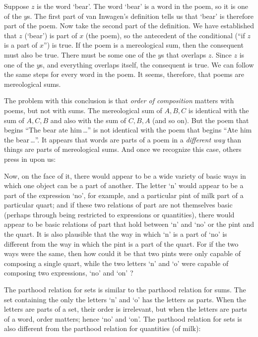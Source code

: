 \documentclass[11pt]{article}
\newenvironment{squote}{%
\begin{spacing}{1}
\begin{list}{}{%
\setlength{\labelwidth}{0pt}%
\rightmargin\leftmargin%
}
\item\relax
}{%
\end{list}%
\end{spacing}
}
\begin{document}
\begin{spacing}{1.5}
Suppose $z$ is the word `bear'.  The word `bear' is a word in the
poem, so it is one of the $y$s.  The first part of van Inwagen's
definition tells us that `bear' is therefore part of the poem.  Now
take the second part of the definition.  We have established that $z$
(`bear') is part of $x$ (the poem), so the antecedent of the
conditional (``if $z$ is a part of $x$'') is true.  If the poem is a
mereological sum, then the consequent must also be true.  There must
be some one of the $y$s that overlaps $z$.  Since $z$ is one of the
$y$s, and everything overlaps itself, the consequent is true.  We can
follow the same steps for every word in the poem.  It seems,
therefore, that poems are mereological sums.

The problem with this conclusion is that {\em order of composition}
matters with poems, but not with sums.  The mereological sum of $A, B,
C$ is identical with the sum of $A, C, B$ and also with the sum of $C,
B, A$ (and so on).  But the poem that begins ``The bear ate
him\,\ldots '' is not identical with the poem that begins ``Ate him
the bear\,\ldots ''.  It appears that words are parts of a poem in a
{\em different way} than things are parts of mereological sums.  And
once we recognize this case, others press in upon us:

\begin{squote}
Now, on the face of it, there would appear to be a wide variety of
basic ways in which one object can be a part of another.  The letter
`n' would appear to be a part of the expression `no', for example, and
a particular pint of milk part of a particular quart; and if these two
relations of part are not themselves basic (perhaps through being
restricted to expressions or quantities), there would appear to be
basic relations of part that hold between `n' and `no' or the pint and
the quart.  It is also plausible that the way in which `n' is a part
of `no' is different from the way in which the pint is a part of the
quart.  For if the two ways were the same, then how could it be that
two pints were only capable of composing a single quart, while the two
letters `n' and `o' were capable of composing two expressions, `no'
and `on' \citep[562]{fine2010}?
\end{squote}

The parthood relation for sets is similar to the parthood relation for
sums.  The set containing the only the letters `n' and `o' has the
letters as parts.  When the letters are parts of a set, their order is
irrelevant, but when the letters are parts of a word, order matters;
hence `no' and `on'.  The parthood relation for sets is also different
from the parthood relation for quantities (of milk):


\end{spacing}
\end{document}
